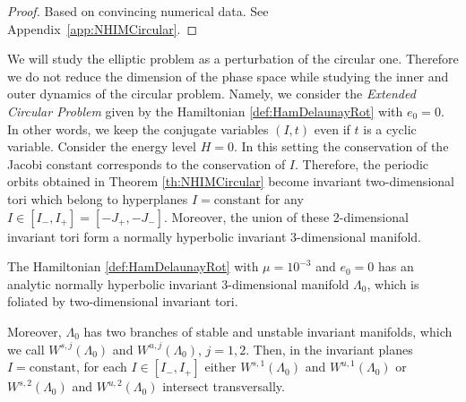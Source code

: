 \begin{proof}
  Based on convincing numerical data. See
  Appendix~\ref{app:NHIMCircular}.
\end{proof}


We will study the elliptic problem as a perturbation of the circular
one.  Therefore we do not reduce the dimension of the phase space
while studying the inner and outer dynamics of the circular
problem. Namely, we consider the \emph{Extended Circular Problem}
given by the Hamiltonian \eqref{def:HamDelaunayRot} with $e_0=0$. In
other words, we keep the conjugate variables $(I,t)$ even if $t$ is a
cyclic variable. Consider the energy level $H=0$.  In this setting the
conservation of the Jacobi constant corresponds to the conservation of
$I$. Therefore, the periodic orbits obtained in Theorem
\ref{th:NHIMCircular} become invariant two-dimensional tori which
belong to hyperplanes $I=\text{constant}$ for any $I\in [I_-,I_+]=
[-J_+,-J_-]$. Moreover, the union of these 2-dimensional invariant
tori form a normally hyperbolic invariant $3$-dimensional manifold.


\begin{corollary}\label{coro:NHIMCircular}
  The Hamiltonian \eqref{def:HamDelaunayRot} with $\mu=10^{-3}$ and
  $e_0=0$ has an analytic normally hyperbolic invariant  $3$-dimensional
  manifold $\Lambda_0$, which is foliated by two-dimensional invariant
  tori.


  Moreover, $\Lambda_0$ has two branches of stable and unstable 
  invariant manifolds, which we call $W^{s,j}(\Lambda_0)$ and 
  $W^{u,j}(\Lambda_0)$, $j=1,2$. Then, in the invariant planes 
  $I=\text{constant}$,  for each $I\in [I_-,I_+]$ either 
  $W^{s,1}(\Lambda_0)$ and $W^{u,1}(\Lambda_0)$ or 
  $W^{s,2}(\Lambda_0)$ and $W^{u,2}(\Lambda_0)$ intersect transversally.
\end{corollary}


